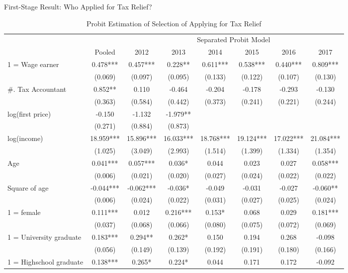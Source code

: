 \documentclass[
  ignorenonframetext,
  aspectratio=169,
]{beamer}
\begin{document}
\begin{frame}{First-Stage Result: Who Applied for Tax Relief?}
\protect\hypertarget{first-stage-result-who-applied-for-tax-relief}{}
\begin{table}

\caption{\label{tab:unnamed-chunk-19}Probit Estimation of Selection of Applying for Tax Relief}
\centering
\fontsize{6}{8}\selectfont
\begin{tabular}[t]{lccccccc}
\toprule
\multicolumn{2}{c}{ } & \multicolumn{6}{c}{Separated Probit Model} \\
\cmidrule(l{3pt}r{3pt}){3-8}
  & Pooled & 2012 & 2013 & 2014 & 2015 & 2016 & 2017\\
\midrule
1 = Wage earner & 0.478*** & 0.457*** & 0.228** & 0.611*** & 0.538*** & 0.440*** & 0.809***\\
 & (0.069) & (0.097) & (0.095) & (0.133) & (0.122) & (0.107) & (0.130)\\
\#. Tax Accountant & 0.852** & 0.110 & -0.464 & -0.204 & -0.178 & -0.293 & -0.130\\
 & (0.363) & (0.584) & (0.442) & (0.373) & (0.241) & (0.221) & (0.244)\\
log(first price) & -0.150 & -1.132 & -1.979** &  &  &  & \\
 & (0.271) & (0.884) & (0.873) &  &  &  & \\
log(income) & 18.959*** & 15.896*** & 16.033*** & 18.768*** & 19.124*** & 17.022*** & 21.084***\\
 & (1.025) & (3.049) & (2.993) & (1.514) & (1.399) & (1.334) & (1.354)\\
Age & 0.041*** & 0.057*** & 0.036* & 0.044 & 0.023 & 0.027 & 0.058***\\
 & (0.006) & (0.021) & (0.020) & (0.027) & (0.024) & (0.022) & (0.022)\\
Square of age & -0.044*** & -0.062*** & -0.036* & -0.049 & -0.031 & -0.027 & -0.060**\\
 & (0.006) & (0.024) & (0.022) & (0.031) & (0.027) & (0.025) & (0.024)\\
1 = female & 0.111*** & 0.012 & 0.216*** & 0.153* & 0.068 & 0.029 & 0.181***\\
 & (0.037) & (0.068) & (0.066) & (0.080) & (0.075) & (0.072) & (0.069)\\
1 = University graduate & 0.183*** & 0.294** & 0.262* & 0.150 & 0.194 & 0.268 & -0.098\\
 & (0.056) & (0.149) & (0.139) & (0.192) & (0.191) & (0.180) & (0.166)\\
1 = Highschool graduate & 0.138*** & 0.265* & 0.224* & 0.044 & 0.171 & 0.172 & -0.092\\

\end{tabular}
\end{table}
\end{frame}
\end{document}
